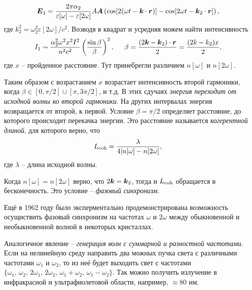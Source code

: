 \begin{equation*}
    \mbox{\boldmath $E$}_1 = \frac{2 \pi \alpha_2}{\varepsilon[\omega]-\varepsilon[2\omega]} A \mbox{\boldmath $A$} \left(
        \cos[2(\omega t - \mbox{\boldmath $k$} \cdot \mbox{\boldmath $r$})] - \cos[2 \omega t - \mbox{\boldmath $k$}_2 \cdot \mbox{\boldmath $r$}]
    \right),
\end{equation*}
где $k_2^2 = \omega_2^2 \varepsilon[2\omega]/c^2$. Возводя в квадрат и усредняя можем найти интенсивность
\begin{equation*}
    I_1 \sim \frac{\alpha_2^2 \omega^2 x^2 I^2}{n^2 c^2} \left(\frac{\sin \beta}{\beta}\right)^2,
    \hspace{5 mm} 
    \beta = \frac{(2\mbox{\boldmath $k$} - \mbox{\boldmath $k$}_2)\cdot \mbox{\boldmath $r$} }{2} = \frac{(2k-k_2)x}{2},
\end{equation*}
где $x$ -- пройденное расстояние. Тут принебрегли различием $n[\omega]$ и $n[2\omega]$. 


Таким образом с возрастанием $x$ возрастает интенсивность второй гармоники, когда $\beta \in [0, \pi/2]\cup[\pi, 3\pi/2]$, и т.д. В этих сдучаях \textit{энергия переходит от исходной волны ко второй гармоники}. На других интервалах энергия возвращается от второй, к первой. Условие $\beta=\pi/2$ определяет расстояние, до которого происходит перекачка энергии. Это расстояние называется \textit{когерентной длиной}, для которого верно, что
\begin{equation*}
    L_{\textnormal{coh}} = \frac{\lambda}{4|n[\omega]-n[2\omega]},
\end{equation*}
где $\lambda$ -- длина исходной волны. 

Когда $n[\omega]=n[2\omega]$ верно, что $2 \mbox{\boldmath $k$} = \mbox{\boldmath $k$}_2$, тогда и $L_{\textnormal{coh}}$ обращается в бесконечность. Это условие -- \textit{фазовый синхронизм}. 


Ещё в 1962 году было эксперментально продемонстрирована возможность осущиствить фазовый синхронизм на частотах $\omega$ и $2 \omega$ между обыкновенной и необыкновенной волной в некоторых кристаллах. 


Аналогичное явление -- \textit{генерация волн с суммарной и разностной частотами}. Если на нелинейную среду направить два можных пучка света с различными частотами $\omega_1$ и $\omega_2$, то из неё будет выходить свет с частотами $\{\omega_1,\, \omega_2,\, 2 \omega_1,\, 2 \omega_2,\, \omega_1+\omega_2,\, \omega_1-\omega_2\}$. Так можно получить излучение в инфракрасной и ультрафиолетовой области, например, $\approx 80$ нм. 